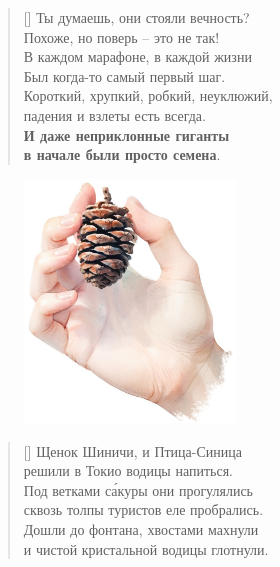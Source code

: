 \documentclass[a5paper,11pt]{memoir}
\begin{document}
\begin{verse}[\versewidth]
	Ты думаешь, они стояли вечность?\\
	Похоже, но поверь -- это не так!\\
	В каждом марафоне, в каждой жизни\\
	Был когда-то самый первый шаг.\\
	Короткий, хрупкий, робкий, неуклюжий,\\
	падения и взлеты есть всегда.\\
	\textbf{И даже неприклонные гиганты \\
	в начале были просто семена}.
\end{verse}

\begin{figure}[h]
	 \centering
	\includegraphics[width=0.5\textwidth]{images/redwood-cone.jpg}
\end{figure}


\clearpage


\PlainPoemTitle
{}
\settowidth{\versewidth}{ступеньки под весом скрипят и трещат ---}
\begin{verse}[\versewidth]
Щенок Шиничи, и Птица-Синица\\
решили в Токио водицы напиться.\\
Под ветками с\'{а}куры они прогулялись\\
сквозь толпы туристов еле пробрались.\\
Дошли до фонтана, хвостами махнули\\
и чистой кристальной водицы глотнули.\\
\end{verse}
\end{document}
